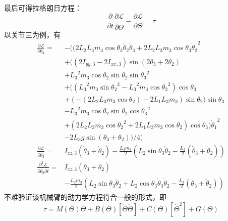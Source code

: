 \documentclass{ctexart}
\begin{document}
最后可得拉格朗日方程：
\[
    \frac{\partial}{\partial t} \frac{\partial \mathcal L}{\partial \dot \Theta} - \frac{\partial \mathcal L}{\partial \Theta} = \tau
\]
以关节三为例，有
\[
    \begin{aligned}
        \frac{\partial \mathcal L}{\partial \theta_3}
        = &
         - ((2 {L_2} {L_3} {m_3} \cos\theta_3 \dot\theta_2 \dot\theta_3 + 2 {L_2} {L_3} {m_3} \cos\theta_3 {{\dot\theta_2}^{2}} 
         \\ &
         + (\left( 2 I_{yy,3} - 2 I_{xx,3}\right)  \sin{\left( 2 {{\theta }_3} + 2 {{\theta }_2}\right) }
         \\ &
         + {{{L_3}}^{2}} {m_3} \cos\theta_2 \sin\theta_2 {{\sin\theta_3}^{2}} 
         \\ &
         + (\left( {{{L_3}}^{2}} {m_3} {{\sin\theta_2}^{2}} - {{{L_3}}^{2}} {m_3} {{\cos\theta_2}^{2}}\right)  \cos\theta_3
         \\ &
         + \left(  - \left( 2 {L_2} {L_3} {m_3} \cos\theta_2\right)  - 2 {L_1} {L_3} {m_3}\right)  \sin\theta_2) \sin\theta_3 
         \\ &
         - {{{L_3}}^{2}} {m_3} \cos\theta_2 \sin\theta_2 {{\cos\theta_3}^{2}} 
         \\ &
         + \left( 2 {L_2} {L_3} {m_3} {{\cos\theta_2}^{2}} + 2 {L_1} {L_3} {m_3} \cos\theta_2\right)  \cos\theta_3) {{\dot\theta_1}^{2}} 
         \\ &
         - 2 {L_3} g \sin{\left( {{\theta }_3} + {{\theta }_2}\right) })/4)\mbox{}
        \\
        \frac{\partial \mathcal L}{\partial \dot\theta_3} 
        = &
        {I_{zz,3}} (\dot\theta_3 + \dot\theta_2) - \frac{{L_3} {m_3}}{2} \left( {L_2} \sin\theta_3 \dot\theta_2 - \frac{{L_3}  }{2} (\dot\theta_3 + \dot\theta_2) \right)
        \\
        \frac{\partial^2 \mathcal L}{\partial \dot \theta_3 \partial t}
        = & I_{zz,3} (\ddot\theta_3 + \ddot\theta_2) 
        \\ &
        - \frac{L_3 m_3}{2} \left( L_2 \sin \theta_3 \ddot \theta_2 + L_2 \cos \theta_3 \dot\theta_3 \dot\theta_2
        - \frac{L_3}{2} (\ddot\theta_3 + \ddot\theta_2) \right)
    \end{aligned}
\]
不难验证该机械臂的动力学方程符合一般的形式，即
\begin{equation}
    \label{eqn:dynamics}
    \tau = M(\Theta) \ddot \Theta + B(\Theta) [\dot\Theta \dot\Theta] + C(\Theta) [\dot\Theta^2] + G(\Theta)
\end{equation}
\end{document}
